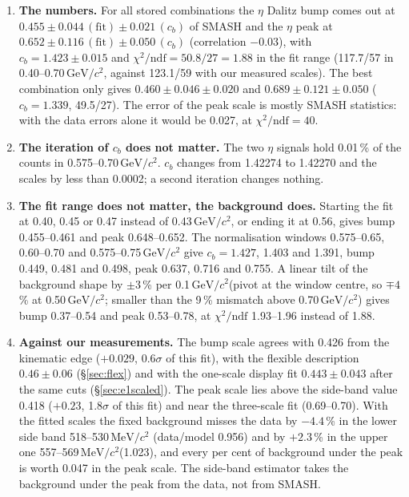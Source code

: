 \documentclass[11pt,a4paper]{article}
\newcommand{\GeVcc}{\ensuremath{\mathrm{GeV}/c^{2}}\xspace}
\newcommand{\MeVcc}{\ensuremath{\mathrm{MeV}/c^{2}}\xspace}
\begin{document}
\begin{enumerate}\setlength{\itemsep}{1pt}
\item \textbf{The numbers.} For all stored combinations the $\eta$ Dalitz bump comes out at $0.455\pm0.044\,(\mathrm{fit})\pm0.021\,(c_b)$ of
      SMASH and the $\eta$ peak at $0.652\pm0.116\,(\mathrm{fit})\pm0.050\,(c_b)$ (correlation $-0.03$), with $c_b=1.423\pm0.015$ and
      $\chi^2/\mathrm{ndf}=50.8/27=1.88$ in the fit range (117.7/57 in 0.40--0.70\,\GeVcc, against 123.1/59 with our measured scales). The
      best combination only gives $0.460\pm0.046\pm0.020$ and $0.689\pm0.121\pm0.050$ ($c_b=1.339$, 49.5/27). The error of the peak scale is
      mostly SMASH statistics: with the data errors alone it would be 0.027, at $\chi^2/\mathrm{ndf}=40$.
\item \textbf{The iteration of $c_b$ does not matter.} The two $\eta$ signals hold 0.01\,\% of the counts in 0.575--0.70\,\GeVcc. $c_b$ changes
      from 1.42274 to 1.42270 and the scales by less than 0.0002; a second iteration changes nothing.
\item \textbf{The fit range does not matter, the background does.} Starting the fit at 0.40, 0.45 or 0.47 instead of 0.43\,\GeVcc, or ending it
      at 0.56, gives bump 0.455--0.461 and peak 0.648--0.652. The normalisation windows 0.575--0.65, 0.60--0.70 and 0.575--0.75\,\GeVcc give
      $c_b=1.427$, 1.403 and 1.391, bump 0.449, 0.481 and 0.498, peak 0.637, 0.716 and 0.755. A linear tilt of the background shape by
      $\pm3$\,\% per 0.1\,\GeVcc (pivot at the window centre, so $\mp4$\,\% at 0.50\,\GeVcc; smaller than the 9\,\% mismatch above
      0.70\,\GeVcc) gives bump 0.37--0.54 and peak 0.53--0.78, at $\chi^2/\mathrm{ndf}$ 1.93--1.96 instead of 1.88.
\item \textbf{Against our measurements.} The bump scale agrees with 0.426 from the kinematic edge ($+0.029$, 0.6$\sigma$ of this fit), with the
      flexible description $0.46\pm0.06$ (\S\ref{sec:flex}) and with the one-scale display fit $0.443\pm0.043$ after the same cuts
      (\S\ref{sec:e1scaled}). The peak scale lies above the side-band value 0.418 ($+0.23$, 1.8$\sigma$ of this fit) and near the three-scale
      fit (0.69--0.70). With the fitted scales the fixed background misses the data by $-4.4$\,\% in the lower side band 518--530\,\MeVcc
      (data/model 0.956) and by $+2.3$\,\% in the upper one 557--569\,\MeVcc (1.023), and every per cent of background under the peak is worth
      0.047 in the peak scale. The side-band estimator takes the background under the peak from the data, not from SMASH.
\end{enumerate}
\end{document}
